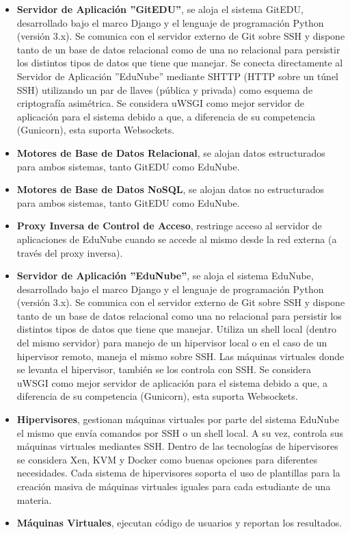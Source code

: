 \begin{itemize}
    \item \textbf{Servidor de Aplicación ''GitEDU''}, se aloja el sistema GitEDU, desarrollado bajo el marco Django y el lenguaje de programación Python (versión 3.x). Se comunica con el servidor externo de Git sobre SSH y dispone tanto de un base de datos relacional como de una no relacional para persistir los distintos tipos de datos que tiene que manejar. Se conecta directamente al Servidor de Aplicación ''EduNube'' mediante SHTTP (HTTP sobre un túnel SSH) utilizando un par de llaves (pública y privada) como esquema de criptografía asimétrica. Se considera uWSGI como mejor servidor de aplicación para el sistema debido a que, a diferencia de su competencia (Gunicorn), esta suporta Websockets.
    \item \textbf{Motores de Base de Datos Relacional}, se alojan datos estructurados para ambos sistemas, tanto GitEDU como EduNube.
    \item \textbf{Motores de Base de Datos NoSQL}, se alojan datos no estructurados para ambos sistemas, tanto GitEDU como EduNube.
    \item \textbf{Proxy Inversa de Control de Acceso}, restringe acceso al servidor de aplicaciones de EduNube cuando se accede al mismo desde la red externa (a través del proxy inversa).
    \item \textbf{Servidor de Aplicación ''EduNube''}, se aloja el sistema EduNube, desarrollado bajo el marco Django y el lenguaje de programación Python (versión 3.x). Se comunica con el servidor externo de Git sobre SSH y dispone tanto de un base de datos relacional como una no relacional para persistir los distintos tipos de datos que tiene que manejar. Utiliza un shell local (dentro del mismo servidor) para manejo de un hipervisor local o en el caso de un hipervisor remoto, maneja el mismo sobre SSH. Las máquinas virtuales donde se levanta el hipervisor, también se los controla con SSH. Se considera uWSGI como mejor servidor de aplicación para el sistema debido a que, a diferencia de su competencia (Gunicorn), esta suporta Websockets.
    \item \textbf{Hipervisores}, gestionan máquinas virtuales por parte del sistema EduNube el mismo que envía comandos por SSH o un shell local. A su vez, controla sus máquinas virtuales mediantes SSH. Dentro de las tecnologías de hipervisores se considera Xen, KVM y Docker como buenas opciones para diferentes necesidades. Cada sistema de hipervisores soporta el uso de plantillas para la creación masiva de máquinas virtuales iguales para cada estudiante de una materia.
    \item \textbf{Máquinas Virtuales}, ejecutan código de usuarios y reportan los resultados.
\end{itemize}

